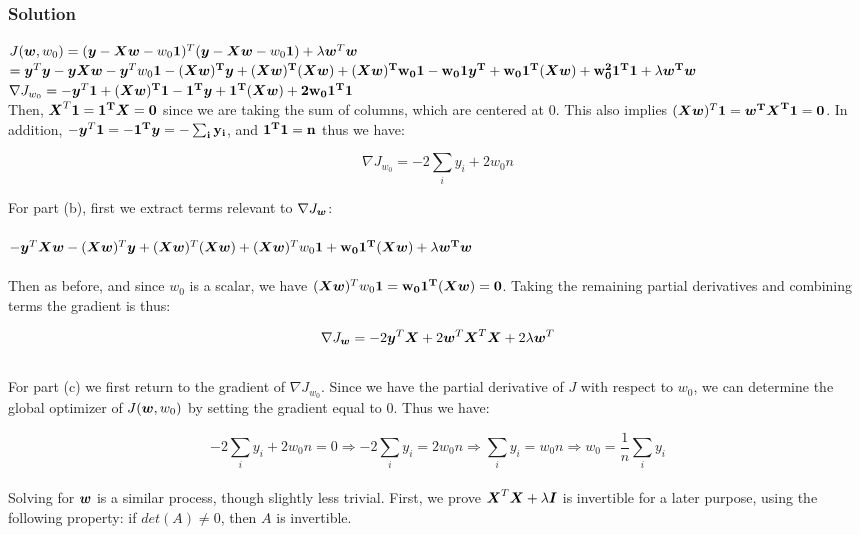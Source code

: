 \documentclass[submit]{harvardml}
\begin{document}
\subsubsection*{Solution}

$J(\boldsymbol{w}, w_0) = (\boldsymbol{y} - \boldsymbol{X} \boldsymbol{w} - w_0 {\bf 1 })^T (\boldsymbol{y} - \boldsymbol{X}
\boldsymbol{w} - w_0 {\bf 1 }) + \lambda \boldsymbol{w}^T \boldsymbol{w}$ \\

$ = \boldsymbol{y}^T\boldsymbol{y} - \boldsymbol{y}\boldsymbol{X}\boldsymbol{w} - \boldsymbol{y}^T w_0 \bf 1 - (\boldsymbol{X}\boldsymbol{w})^T\boldsymbol{y} + (\boldsymbol{X}\boldsymbol{w})^T(\boldsymbol{X}\boldsymbol{w}) + (\boldsymbol{X}\boldsymbol{w})^T w_0 \bf 1 - w_0 \bf 1 \boldsymbol{y}^T + w_0 \bf 1^T(\boldsymbol{X}\boldsymbol{w}) + w_0^2 \bf 1^T {\bf 1} + \lambda \boldsymbol{w}^T \boldsymbol{w}$ \\

\noindent
$\nabla J_{w_0} = -\boldsymbol{y}^T\bf 1 + (\boldsymbol{X}\boldsymbol{w})^T\bf 1 - \bf 1^T\boldsymbol{y} + \bf 1^T(\boldsymbol{X}\boldsymbol{w}) + 2w_0 \bf 1^T\bf 1 $ \\

\noindent
Then, $\boldsymbol{X}^T\bf 1 = \bf 1^T\boldsymbol{X} = 0$ since we are taking the sum of columns, which are centered at $0$. This also implies $(\boldsymbol{X}\boldsymbol{w})^T \bf 1 = \boldsymbol{w}^T\boldsymbol{X}^T\bf 1= 0$. In addition, $-\boldsymbol{y}^T\bf 1 = - \bf 1^T\boldsymbol{y} = -\sum_i y_i$, and $\bf 1^T \bf 1 = n$ thus we have:

$$ \nabla J_{w_0} = -2\sum_i y_i + 2w_0n$$

\pagebreak
\noindent
For part (b), first we extract terms relevant to $\nabla J_{\boldsymbol{w}}$: 
\\\\
$-\boldsymbol{y}^T\boldsymbol{X}\boldsymbol{w} - (\boldsymbol{X}\boldsymbol{w})^T\boldsymbol{y} + (\boldsymbol{X}\boldsymbol{w})^T(\boldsymbol{X}\boldsymbol{w}) + (\boldsymbol{X}\boldsymbol{w})^T w_0 \bf 1 + w_0 \bf 1^T (\boldsymbol{X}\boldsymbol{w}) + \lambda\boldsymbol{w}^T\boldsymbol{w} $
\\\\
Then as before, and since $w_0$ is a scalar, we have $(\boldsymbol{X}\boldsymbol{w})^T w_0 \bf 1 = w_0 \bf 1^T (\boldsymbol{X}\boldsymbol{w}) = 0$. Taking the remaining partial derivatives and combining terms the gradient is thus:

$$ \nabla J_{\boldsymbol{w}} = -2\boldsymbol{y}^T\boldsymbol{X} + 2\boldsymbol{w}^T\boldsymbol{X}^T\boldsymbol{X} + 2\lambda\boldsymbol{w}^T$$
\\
\noindent 
For part (c) we first return to the gradient of $\nabla J_{w_0}$. Since we have the partial derivative of $J$ with respect to $w_0$, we can determine the global optimizer of $J(\boldsymbol{w}, w_0)$ by setting the gradient equal to $0$. Thus we have:

$$-2\sum_i y_i + 2w_0n = 0 \Rightarrow -2\sum_i y_i = 2w_0n \Rightarrow \sum_i y_i = w_0n \Rightarrow w_0 = \frac{1}{n}\sum_i y_i $$
\\
\noindent
Solving for $\boldsymbol{w}$ is a similar process, though slightly less trivial. First, we prove $\boldsymbol{X}^T\boldsymbol{X}+\lambda\boldsymbol{I}$ is invertible for a later purpose, using the following property: if $det(A) \neq 0$, then $A$ is invertible.
\end{document}
